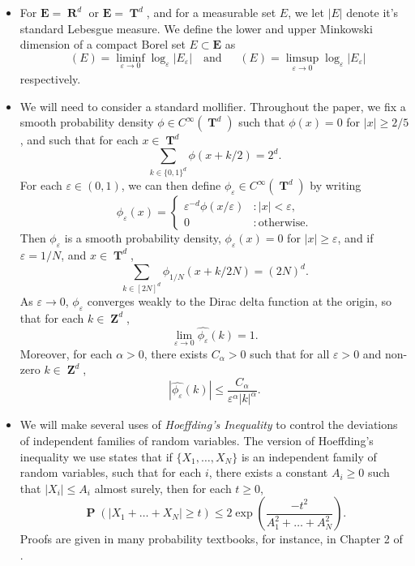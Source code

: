 \documentclass[12pt,reqno]{article}
\DeclareMathOperator{\lowminkdim}{\underline{\dim}_{\mathbf{M}}}
\DeclareMathOperator{\upminkdim}{\overline{\dim}_{\mathbf{M}}}
\DeclareMathOperator{\RR}{\mathbf{R}}
\DeclareMathOperator{\ZZ}{\mathbf{Z}}
\DeclareMathOperator{\TT}{\mathbf{T}}
\DeclareMathOperator{\PP}{\mathbf{P}}
\begin{document}
\begin{itemize}
    \item For $\mathbf{E} = \RR^d$ or $\mathbf{E} = \TT^d$, and for a measurable set $E$, we let $|E|$ denote it's standard Lebesgue measure. We define the lower and upper Minkowski dimension of a compact Borel set $E \subset \mathbf{E}$ as
    \[ \lowminkdim(E) = \liminf_{\varepsilon \to 0} \log_\varepsilon|E_\varepsilon| \quad\text{and}\quad \upminkdim(E) = \limsup_{\varepsilon \to 0} \log_\varepsilon |E_\varepsilon| \]
    respectively.

    \item We will need to consider a standard mollifier. Throughout the paper, we fix a smooth probability density $\phi \in C^\infty(\TT^d)$ such that $\phi(x) = 0$ for $|x| \geq 2/5$, and such that for each $x \in \TT^d$
    \[ \sum_{k \in \{ 0, 1 \}^d} \phi(x + k/2) = 2^d. \]
    For each $\varepsilon \in (0,1)$, we can then define $\phi_\varepsilon \in C^\infty(\TT^d)$ by writing
    \[ \phi_\varepsilon(x) = \begin{cases} \varepsilon^{-d} \phi(x/\varepsilon) &: |x| < \varepsilon, \\ 0 &: \text{otherwise}. \end{cases} \]
    Then $\phi_\varepsilon$ is a smooth probability density, $\phi_\varepsilon(x) = 0$ for $|x| \geq \varepsilon$, and if $\varepsilon = 1/N$, and $x \in \TT^d$,
    \begin{equation} \label{equation5550002352124124512}
        \sum_{k \in [2N]^d} \phi_{1/N}(x + k/2N) = (2N)^d.
    \end{equation}
    As $\varepsilon \to 0$, $\phi_\varepsilon$ converges weakly to the Dirac delta function at the origin, so that for each $k \in \ZZ^d$,
    \begin{equation} \label{approximationtoidentitypointwiseconvergence}
        \lim_{\varepsilon \to 0} \widehat{\phi_\varepsilon}(k) = 1.
    \end{equation}
    Moreover, for each $\alpha > 0$, there exists $C_\alpha > 0$ such that for all $\varepsilon > 0$ and non-zero $k \in \ZZ^d$,
    \begin{equation} \label{molificationdecaybound}
        |\widehat{\phi_\varepsilon}(k)| \leq \frac{C_\alpha}{\varepsilon^\alpha |k|^\alpha}.
    \end{equation}

    \item We will make several uses of \emph{Hoeffding's Inequality} to control the deviations of independent families of random variables. The version of Hoeffding's inequality we use states that if $\{ X_1, \dots, X_N \}$ is an independent family of random variables, such that for each $i$, there exists a constant $A_i \geq 0$ such that $|X_i| \leq A_i$ almost surely, then for each $t \geq 0$,
    \[ \PP \left( |X_1 + \dots + X_N| \geq t \right) \leq 2 \exp \left(\frac{-t^2}{A_1^2 + \dots + A_N^2} \right). \]
    Proofs are given in many probability textbooks, for instance, in Chapter 2 of \cite{Vershynin}.


\end{itemize}
\end{document}
